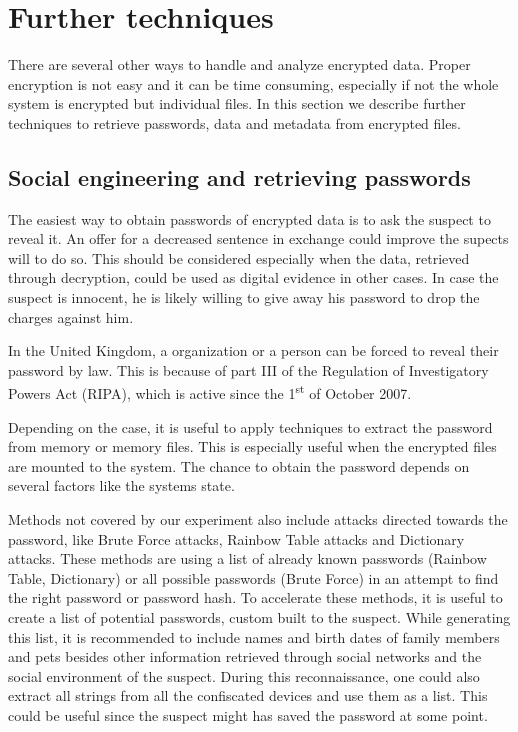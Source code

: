 \section{Further techniques}
There are several other ways to handle and analyze encrypted data. 
Proper encryption is not easy and it can be time consuming, especially if not the whole system is encrypted but individual files. 
In this section we describe further techniques to retrieve passwords, data and metadata from encrypted files.
\subsection{Social engineering and retrieving passwords}
The easiest way to obtain passwords of encrypted data is to ask the suspect to reveal it.
An offer for a decreased sentence in exchange could improve the supects will to do so.
This should be considered especially when the data, retrieved through decryption, could be used as digital evidence in other cases.
In case the suspect is innocent, he is likely willing to give away his password to drop the charges against him.

In the United Kingdom, a organization or a person can be forced to reveal their password by law. 
This is because of part III of the Regulation of Investigatory Powers Act (RIPA), which is active since the 1\textsuperscript{st} of October 2007.\cite{lowman2010effect}

Depending on the case, it is useful to apply techniques to extract the password from memory or  memory files. 
This is especially useful when the encrypted files are mounted to the system. 
The chance to obtain the password depends on several factors like the systems state.\cite{MaartmannMoe2009S132}

Methods not covered by our experiment also include attacks directed towards the password, like Brute Force attacks, Rainbow Table attacks and Dictionary attacks. 
These methods are using a list of already known passwords (Rainbow Table, Dictionary) or all possible passwords (Brute Force) in an attempt to find the right password or password hash.
To accelerate these methods, it is useful to create a list of potential passwords, custom built to the suspect. 
While generating this list, it is recommended to include names and birth dates of family members and pets besides other information retrieved through social networks and the social environment of the suspect. 
During this reconnaissance, one could also extract all strings from all the confiscated devices and use them as a list. 
This could be useful since the suspect might has saved the password at some point. 

